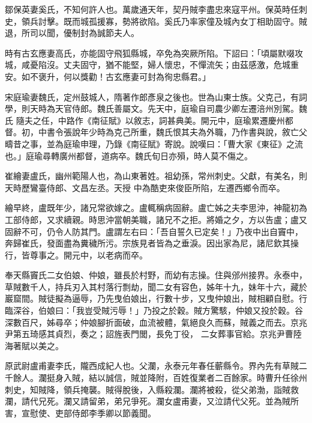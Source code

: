 \begin{pinyinscope}
 鄒保英妻奚氏，不知何許人也。萬歲通天年，契丹賊李盡忠來寇平州。保英時任刺史，領兵討擊。既而城孤援寡，勢將欲陷。奚氏乃率家僮及城內女丁相助固守。賊
 退，所司以聞，優制封為誠節夫人。



 時有古玄應妻高氏，亦能固守飛狐縣城，卒免為突厥所陷。下詔曰：「頃屬默啜攻城，咸憂陷沒。丈夫固守，猶不能堅，婦人懷忠，不憚流矢；由茲感激，危城重安。如不褒升，何以獎勸！古玄應妻可封為徇忠縣君。」



 宋庭瑜妻魏氏，定州鼓城人，隋著作郎彥泉之後也。世為山東士族。父克己，有詞學，則天時為天官侍郎。魏氏善屬文。先天中，庭瑜自司農少卿左遷涪州別駕。魏氏
 隨夫之任，中路作《南征賦》以敘志，詞甚典美。開元中，庭瑜累遷慶州都督。初，中書令張說年少時為克己所重，魏氏恨其夫為外職，乃作書與說，敘亡父疇昔之事，並為庭瑜申理，乃錄《南征賦》寄說。說嘆曰：「曹大家《東征》之流也。」庭瑜尋轉廣州都督，道病卒。魏氏旬日亦殞，時人莫不傷之。



 崔繪妻盧氏，幽州範陽人也，為山東著姓。祖幼孫，常州刺史。父獻，有美名，則天時歷鸞臺侍郎、文昌左丞。天授
 中為酷吏來俊臣所陷，左遷西鄉令而卒。



 繪早終，盧既年少，諸兄常欲嫁之。盧輒稱病固辭。盧亡姊之夫李思沖，神龍初為工部侍郎，又求續親。時思沖當朝美職，諸兄不之拒。將婚之夕，方以告盧；盧又固辭不可，仍令人防其門。盧謂左右曰：「吾自誓久已定矣！」乃夜中出自竇中，奔歸崔氏，發面盡為糞穢所污。宗族見者皆為之垂淚。因出家為尼，諸尼欽其操行，皆尊事之。開元中，以老病而卒。



 奉天縣竇氏二女伯娘、仲娘，雖長於村野，而幼有志操。住與邠州接界。永泰中，草賊數千人，持兵刃入其村落行剽劫，聞二女有容色，姊年十九，妹年十六，藏於巖窟間。賊徒擬為逼辱，乃先曳伯娘出，行數十步，又曳仲娘出，賊相顧自慰。行臨深谷，伯娘曰：「我豈受賊污辱！」乃投之於穀。賊方驚駭，仲娘又投於穀。谷深數百尺，姊尋卒；仲娘腳折面破，血流被體，氣絕良久而蘇，賊義之而去。京兆尹第五琦感其貞烈，奏之；詔旌表門閭，長免丁役，
 二女葬事官給。京兆尹曹陸海著賦以美之。



 原武尉盧甫妻李氏，隴西成紀人也。父瀾，永泰元年春任蘄縣令。界內先有草賊二千餘人。瀾挺身入賊，結以誠信，賊並降附，百姓復業者二百餘家。時曹升任徐州刺史，知賊降，領兵掩襲。賊得脫後，入縣殺瀾。瀾將被殺，從父弟渤，詣賊救瀾，請代兄死。瀾又請留弟，弟兄爭死。瀾女盧甫妻，又泣請代父死。並為賊所害，宣慰使、吏部侍郎李季卿以節義聞。




\end{pinyinscope}
